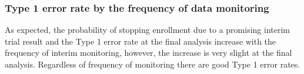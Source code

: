 \documentclass[12pt]{article}
\begin{document}
\subsubsection{Type 1 error rate by the frequency of data monitoring}
As expected, the probability of stopping enrollment due to a promising interim trial result and the Type 1 error rate at the final analysis increase with the frequency of interim monitoring, however, the increase is very slight at the final analysis. Regardless of frequency of monitoring there are good Type 1 error rates. 
\end{document}
